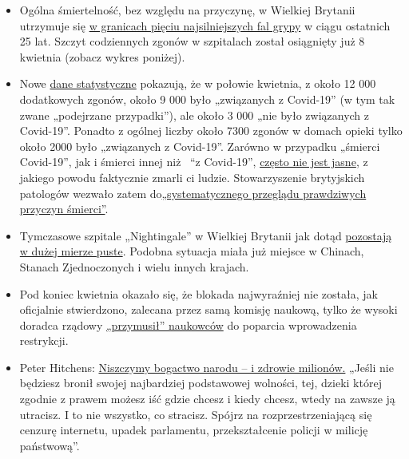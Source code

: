 \begin{itemize}
\tightlist
\item
  Ogólna śmiertelność, bez względu na przyczynę, w Wielkiej Brytanii
  utrzymuje się \href{http://inproportion2.talkigy.com/}{w granicach
  pięciu najsilniejszych fal grypy} w ciągu ostatnich 25 lat. Szczyt
  codziennych zgonów w szpitalach został osiągnięty już 8 kwietnia
  (zobacz wykres poniżej).
\item
  Nowe
  \href{https://www.telegraph.co.uk/politics/2020/05/01/evidence-rising-britains-lockdown-could-deadly-mistake/}{dane
  statystyczne} pokazują, że w połowie kwietnia, z około 12 000
  dodatkowych zgonów, około 9 000 było „związanych z Covid-19'' (w tym
  tak zwane „podejrzane przypadki''), ale około 3 000 „nie było
  związanych z Covid-19''. Ponadto z ogólnej liczby około 7300 zgonów w
  domach opieki tylko około 2000 było „związanych z Covid-19''. Zarówno
  w przypadku „śmierci Covid-19'', jak i śmierci innej niż~ ``z
  Covid-19'',
  \href{https://www.hsj.co.uk/commissioning/thousands-of-extra-deaths-outside-hospital-not-attributed-to-covid-19/7027459.article}{często
  nie jest jasne}, z jakiego powodu faktycznie zmarli ci ludzie.
  Stowarzyszenie brytyjskich patologów wezwało zatem
  do\href{https://www.hsj.co.uk/coronavirus/systematic-reviews-to-discover-true-cause-of-outbreak-deaths/7027491.article}{„systematycznego
  przeglądu prawdziwych przyczyn śmierci''}.
\item
  Tymczasowe szpitale „Nightingale'' w Wielkiej Brytanii jak dotąd
  \href{https://www.telegraph.co.uk/news/0/do-many-nhs-nightingale-hospitals-remain-empty/}{pozostają
  w dużej mierze puste}. Podobna sytuacja miała już miejsce w Chinach,
  Stanach Zjednoczonych i wielu innych krajach.
\item
  Pod koniec kwietnia okazało się, że blokada najwyraźniej nie została,
  jak oficjalnie stwierdzono, zalecana przez samą komisję naukową, tylko
  że wysoki doradca rządowy
  \href{https://www.bloomberg.com/news/articles/2020-04-28/top-aide-to-u-k-s-johnson-pushed-scientists-to-back-lockdown}{„przymusił''
  naukowców} do poparcia wprowadzenia restrykcji.
\item
  Peter Hitchens:
  \href{https://hitchensblog.mailonsunday.co.uk/2020/05/peter-hitchens-were-destroying-the-nations-wealth-and-the-health-of-millions.html}{Niszczymy
  bogactwo narodu -- i zdrowie milionów.} „Jeśli nie będziesz bronił
  swojej najbardziej podstawowej wolności, tej, dzieki której zgodnie z
  prawem możesz iść gdzie chcesz i kiedy chcesz, wtedy na zawsze ją
  utracisz. I to nie wszystko, co stracisz. Spójrz na
  rozprzestrzeniającą się cenzurę internetu, upadek parlamentu,
  przekształcenie policji w milicję państwową''.
\end{itemize}


